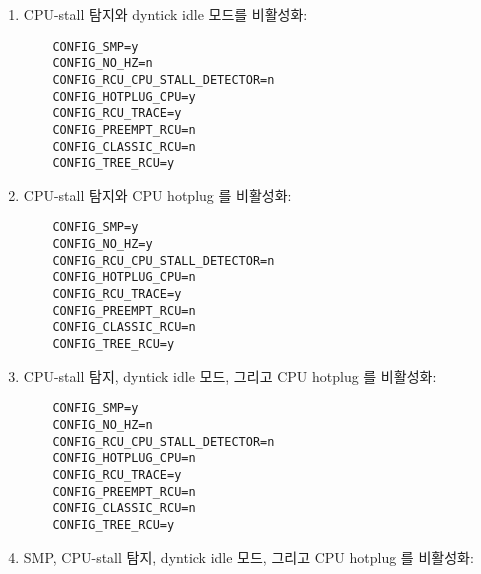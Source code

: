 \begin{enumerate}
\item	CPU-stall 탐지와 dyntick idle 모드를 비활성화:
\iffalse

\item	Disable CPU-stall detection and dyntick idle mode:
\fi

\vspace{5pt}
\begin{minipage}[t]{\columnwidth}
\scriptsize
\begin{verbatim}
	CONFIG_SMP=y
	CONFIG_NO_HZ=n
	CONFIG_RCU_CPU_STALL_DETECTOR=n
	CONFIG_HOTPLUG_CPU=y
	CONFIG_RCU_TRACE=y
	CONFIG_PREEMPT_RCU=n
	CONFIG_CLASSIC_RCU=n
	CONFIG_TREE_RCU=y
\end{verbatim}
\end{minipage}
\vspace{5pt}

\item	CPU-stall 탐지와 CPU hotplug 를 비활성화:
\iffalse

\item	Disable CPU-stall detection and CPU hotplug:
\fi

\vspace{5pt}
\begin{minipage}[t]{\columnwidth}
\scriptsize
\begin{verbatim}
	CONFIG_SMP=y
	CONFIG_NO_HZ=y
	CONFIG_RCU_CPU_STALL_DETECTOR=n
	CONFIG_HOTPLUG_CPU=n
	CONFIG_RCU_TRACE=y
	CONFIG_PREEMPT_RCU=n
	CONFIG_CLASSIC_RCU=n
	CONFIG_TREE_RCU=y
\end{verbatim}
\end{minipage}
\vspace{5pt}

\item	CPU-stall 탐지, dyntick idle 모드, 그리고 CPU hotplug 를 비활성화:
\iffalse

\item	Disable CPU-stall detection, dyntick idle mode, and CPU hotplug:
\fi

\vspace{5pt}
\begin{minipage}[t]{\columnwidth}
\scriptsize
\begin{verbatim}
	CONFIG_SMP=y
	CONFIG_NO_HZ=n
	CONFIG_RCU_CPU_STALL_DETECTOR=n
	CONFIG_HOTPLUG_CPU=n
	CONFIG_RCU_TRACE=y
	CONFIG_PREEMPT_RCU=n
	CONFIG_CLASSIC_RCU=n
	CONFIG_TREE_RCU=y
\end{verbatim}
\end{minipage}
\vspace{5pt}

\item	SMP, CPU-stall 탐지, dyntick idle 모드, 그리고 CPU hotplug 를 비활성화:
\iffalse


\end{enumerate}
